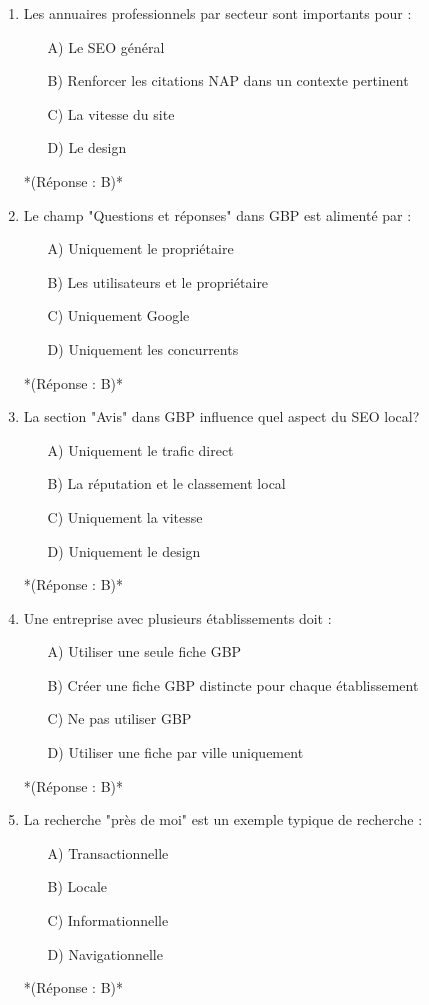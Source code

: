 \documentclass[12pt,a4paper,twoside]{report}
\begin{document}
\begin{enumerate}
\item Les annuaires professionnels par secteur sont importants pour :
\begin{itemize}
\item[A)] Le SEO général
\item[B)] Renforcer les citations NAP dans un contexte pertinent
\item[C)] La vitesse du site
\item[D)] Le design
\end{itemize}
*(Réponse : B)*

\item Le champ "Questions et réponses" dans GBP est alimenté par :
\begin{itemize}
\item[A)] Uniquement le propriétaire
\item[B)] Les utilisateurs et le propriétaire
\item[C)] Uniquement Google
\item[D)] Uniquement les concurrents
\end{itemize}
*(Réponse : B)*

\item La section "Avis" dans GBP influence quel aspect du SEO local?
\begin{itemize}
\item[A)] Uniquement le trafic direct
\item[B)] La réputation et le classement local
\item[C)] Uniquement la vitesse
\item[D)] Uniquement le design
\end{itemize}
*(Réponse : B)*

\item Une entreprise avec plusieurs établissements doit :
\begin{itemize}
\item[A)] Utiliser une seule fiche GBP
\item[B)] Créer une fiche GBP distincte pour chaque établissement
\item[C)] Ne pas utiliser GBP
\item[D)] Utiliser une fiche par ville uniquement
\end{itemize}
*(Réponse : B)*

\item La recherche "près de moi" est un exemple typique de recherche :
\begin{itemize}
\item[A)] Transactionnelle
\item[B)] Locale
\item[C)] Informationnelle
\item[D)] Navigationnelle
\end{itemize}
*(Réponse : B)*


\end{enumerate}
\end{document}
